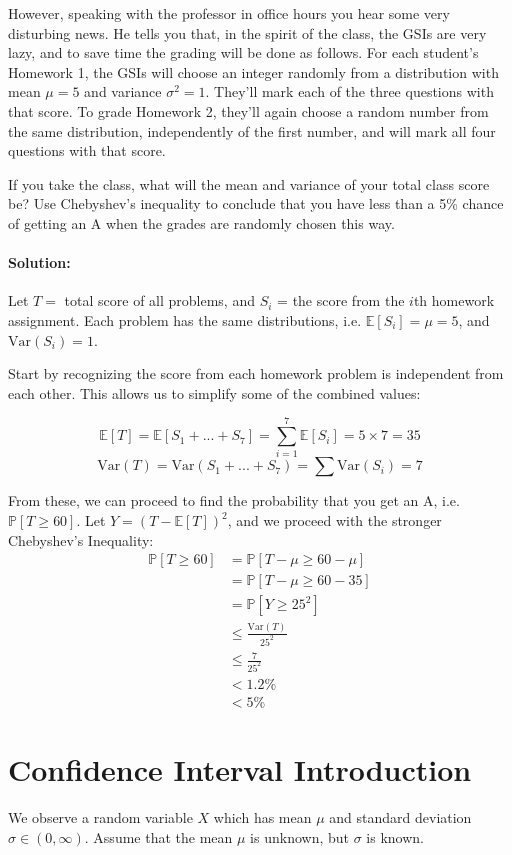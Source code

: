 \documentclass[11pt, notitlepage]{article}
\newcommand{\E}{\mathbb{E}}
\newcommand{\mP}{\mathbb{P}}
\newcommand{\var}[1]{\text{Var}(#1)}
\newcommand{\Question}[1]{\newpage\section{#1}}
\newenvironment{solution}{\paragraph{Solution:}}{\hfill \vspace{10mm}}
\begin{document}
However, speaking with the professor in office hours you hear some very disturbing news. He tells you that, in the spirit of the class, the GSIs are very lazy, and to save time the grading will be done as follows. For each student's Homework 1, the GSIs will choose an integer randomly from a distribution with mean $\mu = 5$ and variance $\sigma^2 = 1$. They'll mark each of the three questions with that score. To grade Homework 2, they'll again choose a random number from the same distribution, independently of the first number, and will mark all four questions with
that score.

If you take the class, what will the mean and variance of your total class score be? Use Chebyshev's inequality to conclude that you have less than a 5\% chance of getting an A when the grades are randomly chosen this way.

\begin{solution}
	
	Let $T=$ total score of all problems, and $S_i$ = the score from the $i$th homework assignment. Each problem has the same distributions, i.e. $\E[S_i]=\mu=5$, and $\var{S_i}=1$. 
	
	Start by recognizing the score from each homework problem is independent from each other. This allows us to simplify some of the combined values:


	\[\E[T]=\E[S_1 + ... + S_7]
	=\sum_{i=1}^{7}{\E[S_i]}
	=5\times 7 =35\]
	$$\var{T}=\var{S_1 + ... + S_7}=\sum{\var{S_i}}=7$$
	
	From these, we can proceed to find the probability that you get an A, i.e. $\mP[T \geq 60]$. Let $Y=(T-\E[T])^2$, and we proceed with the stronger Chebyshev's Inequality:
	\begin{align*}
	\mP[T \geq 60] &= \mP[T-\mu \geq 60 - \mu]\\
	&= \mP[T-\mu \geq 60 - 35]\\
	&= \mP[Y \geq 25^2]\\
	&\leq \frac{\var{T}}{25^2}\\
	&\leq \frac{7}{25^2} \\
	&<1.2\%\\
	&<5\%
	\end{align*}
\end{solution}

\Question{Confidence Interval Introduction}

We observe a random variable $X$ which has mean $\mu$ and standard deviation $\sigma \in (0,\infty)$. Assume that the mean $\mu$ is unknown, but $\sigma$ is known.
\end{document}
